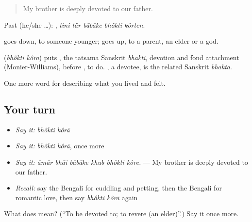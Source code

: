 \begin{quote}
My brother is deeply devoted to our father.
\end{quote}

Past (he/she …):     , \emph{tini tā̃r bābāke bhôkti kôrten}.

 goes down, to someone younger;  goes up, to a parent, an elder or a god.

\begin{cousinweb}
\textbf{ } (\emph{bhôkti kôrā}) puts , the tatsama Sanskrit \emph{bhakti}, devotion and fond attachment (Monier-Williams), before , to do. \textbf{}, a devotee, is the related Sanskrit \emph{bhakta}.
\end{cousinweb}

\begin{grammarlens}[title={What you've built}]
One more word for describing what you lived and felt.
\end{grammarlens}

\subsection*{Your turn}
\begin{itemize}
\raggedright
  \item \emph{Say it:} \emph{bhôkti kôrā}
  \item \emph{Say it:} \emph{bhôkti kôrā}, once more
  \item \emph{Say it:} \emph{āmār bhāi bābāke khub bhôkti kôre.} — My brother is deeply devoted to our father.
  \item \emph{Recall:} say the Bengali for cuddling and petting, then the Bengali for romantic love, then say \emph{bhôkti kôrā} again
\end{itemize}

\begin{tcolorbox}[breakable,colback=teal!4,colframe=teal!35!black,title={Before you move on}]
What does   mean? (\textquotedblleft{}To be devoted to; to revere (an elder)\textquotedblright{}.) Say it once more.
\end{tcolorbox}
